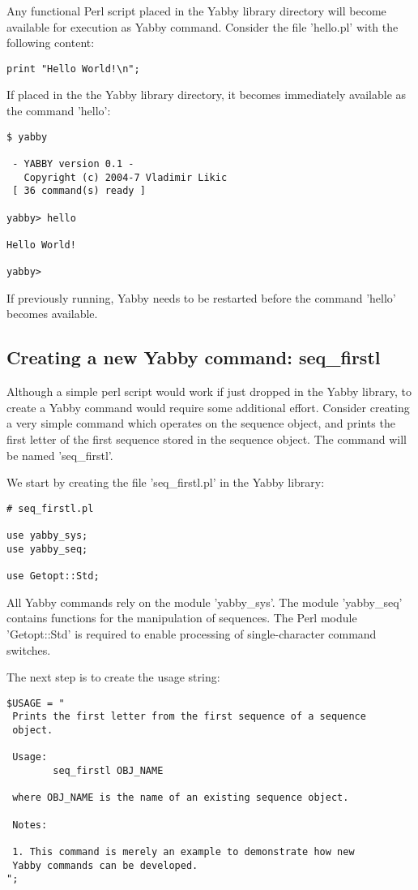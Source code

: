Any functional Perl script placed in the Yabby library directory
will become available for execution as Yabby command.  Consider
the file 'hello.pl' with the following content:

\begin{verbatim}
print "Hello World!\n";
\end{verbatim}

If placed in the the Yabby library directory, it becomes immediately
available as the command 'hello':

\begin{verbatim}
$ yabby

 - YABBY version 0.1 - 
   Copyright (c) 2004-7 Vladimir Likic
 [ 36 command(s) ready ]

yabby> hello

Hello World!

yabby>
\end{verbatim}

If previously running, Yabby needs to be restarted before the command
'hello' becomes available.

\subsection{Creating a new Yabby command: seq\_firstl}

Although a simple perl script would work if just dropped in the Yabby
library, to create a Yabby command would require some additional effort.
Consider creating a very simple command which operates on the sequence
object, and prints the first letter of the first sequence stored in
the sequence object. The command will be named 'seq\_firstl'.

We start by creating the file 'seq\_firstl.pl' in the Yabby library:

\begin{verbatim}
# seq_firstl.pl

use yabby_sys;
use yabby_seq;

use Getopt::Std;
\end{verbatim}

All Yabby commands rely on the module 'yabby\_sys'. The module 'yabby\_seq'
contains functions for the manipulation of sequences. The Perl module
'Getopt::Std' is required to enable processing of single-character
command switches.

The next step is to create the usage string:

\begin{verbatim}
$USAGE = "
 Prints the first letter from the first sequence of a sequence
 object. 

 Usage:
        seq_firstl OBJ_NAME

 where OBJ_NAME is the name of an existing sequence object.

 Notes:

 1. This command is merely an example to demonstrate how new
 Yabby commands can be developed.
";
\end{verbatim}

